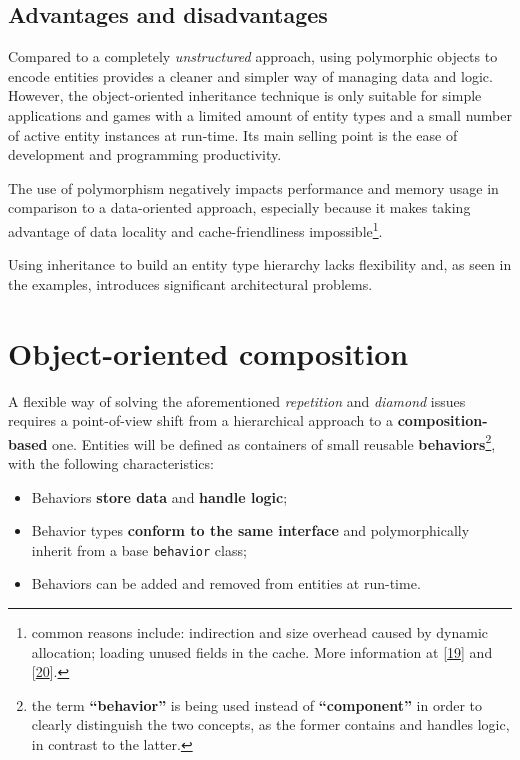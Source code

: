 \documentclass[oneside, 12pt, a4paper, openany]{book}
\begin{document}
\subsection{Advantages and
disadvantages}\label{advantages-and-disadvantages}

Compared to a completely \emph{unstructured} approach, using polymorphic
objects to encode entities provides a cleaner and simpler way of
managing data and logic. However, the object-oriented inheritance
technique is only suitable for simple applications and games with a
limited amount of entity types and a small number of active entity
instances at run-time. Its main selling point is the ease of development
and programming productivity.

The use of polymorphism negatively impacts performance and memory usage
in comparison to a data-oriented approach, especially because it makes
taking advantage of data locality and cache-friendliness
impossible\footnote{common reasons include: indirection and size
  overhead caused by dynamic allocation; loading unused fields in the
  cache. More information at
  {[}\protect\hyperlink{ref-ithare_allocations}{19}{]} and
  {[}\protect\hyperlink{ref-scee_oop_pitfalls}{20}{]}.}.

Using inheritance to build an entity type hierarchy lacks flexibility
and, as seen in the examples, introduces significant architectural
problems.

\section{Object-oriented composition}\label{object-oriented-composition}

A flexible way of solving the aforementioned \emph{repetition} and
\emph{diamond} issues requires a point-of-view shift from a hierarchical
approach to a \textbf{composition-based} one. Entities will be defined
as containers of small reusable \textbf{behaviors}\footnote{the term
  \textbf{``behavior''} is being used instead of \textbf{``component''}
  in order to clearly distinguish the two concepts, as the former
  contains and handles logic, in contrast to the latter.}, with the
following characteristics:

\begin{itemize}
\item
  Behaviors \textbf{store data} and \textbf{handle logic};
\item
  Behavior types \textbf{conform to the same interface} and
  polymorphically inherit from a base
  \texttt{behavior}
  class;
\item
  Behaviors can be added and removed from entities at run-time.
\end{itemize}
\end{document}
